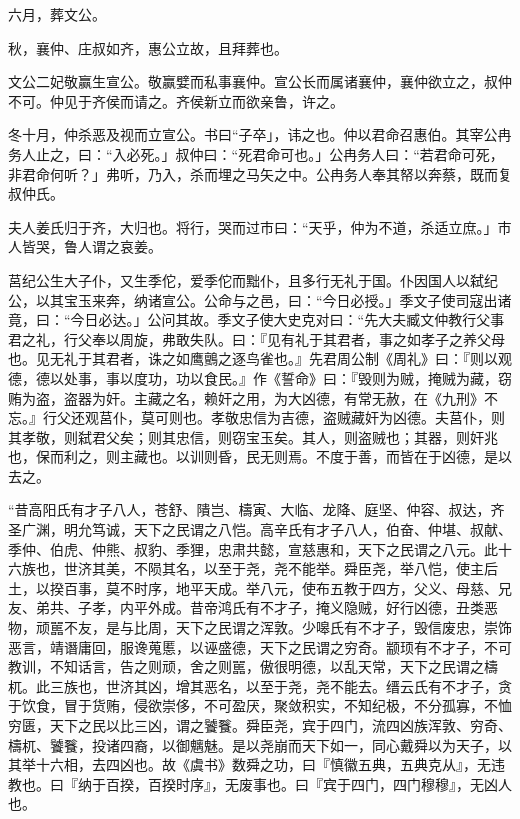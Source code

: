 \documentclass[]{article}
\begin{document}
六月，葬文公。

秋，襄仲、庄叔如齐，惠公立故，且拜葬也。

文公二妃敬赢生宣公。敬赢嬖而私事襄仲。宣公长而属诸襄仲，襄仲欲立之，叔仲不可。仲见于齐侯而请之。齐侯新立而欲亲鲁，许之。

冬十月，仲杀恶及视而立宣公。书曰``子卒」，讳之也。仲以君命召惠伯。其宰公冉务人止之，曰：``入必死。」叔仲曰：``死君命可也。」公冉务人曰：``若君命可死，非君命何听？」弗听，乃入，杀而埋之马矢之中。公冉务人奉其帑以奔蔡，既而复叔仲氏。

夫人姜氏归于齐，大归也。将行，哭而过市曰：``天乎，仲为不道，杀适立庶。」市人皆哭，鲁人谓之哀姜。

莒纪公生大子仆，又生季佗，爱季佗而黜仆，且多行无礼于国。仆因国人以弑纪公，以其宝玉来奔，纳诸宣公。公命与之邑，曰：``今日必授。」季文子使司寇出诸竟，曰：``今日必达。」公问其故。季文子使大史克对曰：``先大夫臧文仲教行父事君之礼，行父奉以周旋，弗敢失队。曰：『见有礼于其君者，事之如孝子之养父母也。见无礼于其君者，诛之如鹰鸇之逐鸟雀也。』先君周公制《周礼》曰：『则以观德，德以处事，事以度功，功以食民。』作《誓命》曰：『毁则为贼，掩贼为藏，窃贿为盗，盗器为奸。主藏之名，赖奸之用，为大凶德，有常无赦，在《九刑》不忘。』行父还观莒仆，莫可则也。孝敬忠信为吉德，盗贼藏奸为凶德。夫莒仆，则其孝敬，则弑君父矣；则其忠信，则窃宝玉矣。其人，则盗贼也；其器，则奸兆也，保而利之，则主藏也。以训则昏，民无则焉。不度于善，而皆在于凶德，是以去之。

``昔高阳氏有才子八人，苍舒、隤岂、檮寅、大临、龙降、庭坚、仲容、叔达，齐圣广渊，明允笃诚，天下之民谓之八恺。高辛氏有才子八人，伯奋、仲堪、叔献、季仲、伯虎、仲熊、叔豹、季狸，忠肃共懿，宣慈惠和，天下之民谓之八元。此十六族也，世济其美，不陨其名，以至于尧，尧不能举。舜臣尧，举八恺，使主后土，以揆百事，莫不时序，地平天成。举八元，使布五教于四方，父义、母慈、兄友、弟共、子孝，内平外成。昔帝鸿氏有不才子，掩义隐贼，好行凶德，丑类恶物，顽嚚不友，是与比周，天下之民谓之浑敦。少嗥氏有不才子，毁信废忠，崇饰恶言，靖谮庸回，服谗蒐慝，以诬盛德，天下之民谓之穷奇。颛顼有不才子，不可教训，不知话言，告之则顽，舍之则嚚，傲很明德，以乱天常，天下之民谓之檮杌。此三族也，世济其凶，增其恶名，以至于尧，尧不能去。缙云氏有不才子，贪于饮食，冒于货贿，侵欲崇侈，不可盈厌，聚敛积实，不知纪极，不分孤寡，不恤穷匮，天下之民以比三凶，谓之饕餮。舜臣尧，宾于四门，流四凶族浑敦、穷奇、檮杌、饕餮，投诸四裔，以御魑魅。是以尧崩而天下如一，同心戴舜以为天子，以其举十六相，去四凶也。故《虞书》数舜之功，曰『慎徽五典，五典克从』，无违教也。曰『纳于百揆，百揆时序』，无废事也。曰『宾于四门，四门穆穆』，无凶人也。
\end{document}

